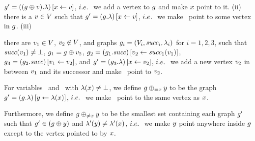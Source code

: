 \begin{graphop}[$\graph\addVar{\xvar}$]
    $g'=\left((g\oplus{\ensuremath{v}}).\lambda\right)\left[x\leftarrow v\right]$,
    $i.e.\ $ we add a vertex to $g$ and make $x$ point to it.
(ii) \label{addVar2}%
    there is a $v\in V$ such that
    $g'=\left(g.\lambda\right)\left[x\leftarrow v\right]$,
    $i.e.\ $ we make \xvar\ point to some vertex %
    in $g$.
(iii) \label{addVar3}%
    there are $v_1\in V$, $v_2\not\in V$,
    and graphs $g_i=(V_i,{\it succ}_i,\lambda_i)$ for
    $i=1,2,3$, such that ${\it succ}(v_1)\neq\bot$,
    $g_1=g\oplus{\ensuremath{v}}_2$,
    $g_2=\left(g_1.{\it succ}\right)\left[v_2\leftarrow{\it succ}_1(v_1)\right]$,
    $g_3=\left(g_2.{\it succ}\right)\left[v_1\leftarrow v_2\right]$,
    and
    $g'=\left(g_3.\lambda\right)\left[x\leftarrow v_2\right]$,
    $i.e.\ $ we add a new vertex %
    $v_2$ in between $v_1$ and its successor and make
    \xvar\ point to $v_2$.
\end{graphop}
%

\begin{graphop}[$\graph\addEqVar{\xvar}{\yvar}$]
  For variables \xvar\ and \yvar\ with $\lambda(x)\neq\bot$, 
  we define $\graph\addEqVar{\xvar}{\yvar}$ to be the graph
  $g'=\left(g.\lambda\right)\left[y\leftarrow\lambda(x)\right]$,
  $i.e.\ $ we make \yvar\ point to the same vertex %
  as $x$.
\end{graphop}
%
\begin{graphop}[$\graph\addNotEqVar{\xvar}{\yvar}$]
  Furthermore, we define $\graph\addNotEqVar{\xvar}{\yvar}$ to be the
  smallest set containing each
  graph %
  $g'$ %
  such that $g'\in(g\oplus{\ensuremath{y}})$ and
  $\lambda'(y)\neq\lambda'(x)$, $i.e.\ $ we make $y$
  point anywhere inside $g$ except to the vertex %
  pointed to by $x$.
\end{graphop}
%

